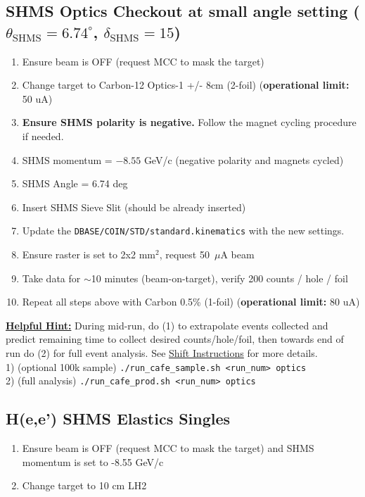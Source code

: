 \documentclass{article}
\begin{document}
    \subsection*{SHMS Optics Checkout at small angle setting ($\theta_{\mathrm{SHMS}} =6.74^{\circ}$, $\delta_{\mathrm{SHMS}}=15$)}
\begin{enumerate}
    \item Ensure beam is OFF (request MCC to mask the target)
    \item Change target to Carbon-12 Optics-1 +/- 8cm (2-foil) (\textbf{operational limit:} 50 uA) 
    \item \textbf{Ensure SHMS polarity is negative.} Follow the magnet cycling procedure if needed.
    \item SHMS momentum = $-8.55$ GeV/c (negative polarity and magnets cycled) 
    \item SHMS Angle = 6.74  deg 
    \item Insert SHMS Sieve Slit (should be already inserted)
    \item Update the \texttt{DBASE/COIN/STD/standard.kinematics} with the new settings.
    \item Ensure raster is set to 2x2 mm$^{2}$, request 50~$\mu$A beam
    \item Take data for $\sim$10 minutes (beam-on-target), verify 200 counts / hole / foil
    \item Repeat all steps above with Carbon 0.5\% (1-foil) (\textbf{operational limit:} 80 uA)
\end{enumerate}
\textbf{\underline{Helpful Hint:}} During mid-run, do (1) to extrapolate events collected and predict remaining time to collect desired counts/hole/foil, then towards end of run do (2) for full event analysis. See \href{https://github.com/Yero1990/cafe_online_replay/wiki/CaFe:-Instructions-for-Shift-Takers}{Shift Instructions} for more details.\\ 
1) (optional 100k sample) \texttt{./run\_cafe\_sample.sh <run\_num> optics} \\
2) (full analysis) \texttt{./run\_cafe\_prod.sh <run\_num> optics}

\newpage
\subsection*{H(e,e') SHMS Elastics Singles}
\begin{enumerate}
    \item Ensure beam is OFF (request MCC to mask the target) and SHMS momentum is set to -8.55 GeV/c
    \item Change target to 10 cm LH2 
    \end{enumerate}
\end{document}
